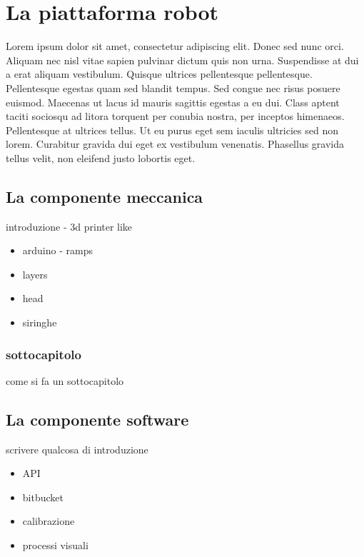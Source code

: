\chapter{La piattaforma robot}
\vspace{0.5cm}

\label{cha:789}
Lorem ipsum dolor sit amet, consectetur adipiscing elit. Donec sed nunc orci. Aliquam nec nisl vitae sapien pulvinar dictum quis non urna. Suspendisse at dui a erat aliquam vestibulum. Quisque ultrices pellentesque pellentesque. Pellentesque egestas quam sed blandit tempus. Sed congue nec risus posuere euismod. Maecenas ut lacus id mauris sagittis egestas a eu dui. Class aptent taciti sociosqu ad litora torquent per conubia nostra, per inceptos himenaeos. Pellentesque at ultrices tellus. Ut eu purus eget sem iaculis ultricies sed non lorem. Curabitur gravida dui eget ex vestibulum venenatis. Phasellus gravida tellus velit, non eleifend justo lobortis eget. 


\section{La componente meccanica}
\label{sec:456}
introduzione - 3d printer like
\begin{itemize}
  \item arduino - ramps
  \item layers 
  \item head
  \item siringhe
\end{itemize}


\subsection{sottocapitolo}
\label{sec:00456}
come si fa un sottocapitolo


\section{La componente software}
\label{sec:123}
scrivere qualcosa di introduzione
\begin{itemize}
  \item API 
  \item bitbucket
  \item calibrazione
  \item processi visuali
\end{itemize}


